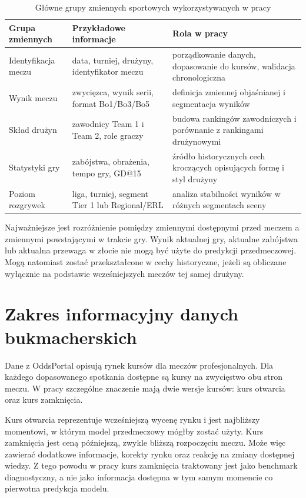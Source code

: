 \begin{table}[H]
    \centering
    \caption{Główne grupy zmiennych sportowych wykorzystywanych w pracy}
    \label{tab:sport_variable_groups}
    \small
    \begin{tabular}{p{3.8cm}p{4.6cm}p{5.0cm}}
        \toprule
        Grupa zmiennych & Przykładowe informacje & Rola w pracy \\
        \midrule
        Identyfikacja meczu & data, turniej, drużyny, identyfikator meczu & porządkowanie danych, dopasowanie do kursów, walidacja chronologiczna \\
        Wynik meczu & zwycięzca, wynik serii, format Bo1/Bo3/Bo5 & definicja zmiennej objaśnianej i segmentacja wyników \\
        Skład drużyn & zawodnicy Team 1 i Team 2, role graczy & budowa rankingów zawodniczych i porównanie z rankingami drużynowymi \\
        Statystyki gry & zabójstwa, obrażenia, tempo gry, GD@15 & źródło historycznych cech kroczących opisujących formę i styl drużyny \\
        Poziom rozgrywek & liga, turniej, segment Tier 1 lub Regional/ERL & analiza stabilności wyników w różnych segmentach sceny \\
        \bottomrule
    \end{tabular}
\end{table}

Najważniejsze jest rozróżnienie pomiędzy zmiennymi dostępnymi przed meczem a zmiennymi powstającymi
w trakcie gry. Wynik aktualnej gry, aktualne zabójstwa lub aktualna przewaga w złocie nie mogą być
użyte do predykcji przedmeczowej. Mogą natomiast zostać przekształcone w cechy historyczne, jeżeli
są obliczane wyłącznie na podstawie wcześniejszych meczów tej samej drużyny.

\section{Zakres informacyjny danych bukmacherskich}

Dane z OddsPortal opisują rynek kursów dla meczów profesjonalnych. Dla każdego dopasowanego
spotkania dostępne są kursy na zwycięstwo obu stron meczu. W pracy szczególne znaczenie mają dwie
wersje kursów: kurs otwarcia oraz kurs zamknięcia.

Kurs otwarcia reprezentuje wcześniejszą wycenę rynku i jest najbliższy momentowi, w którym model
przedmeczowy mógłby zostać użyty. Kurs zamknięcia jest ceną późniejszą, zwykle bliższą rozpoczęciu
meczu. Może więc zawierać dodatkowe informacje, korekty rynku oraz reakcję na zmiany dostępnej
wiedzy. Z tego powodu w pracy kurs zamknięcia traktowany jest jako benchmark diagnostyczny, a nie
jako informacja dostępna w tym samym momencie co pierwotna predykcja modelu.

